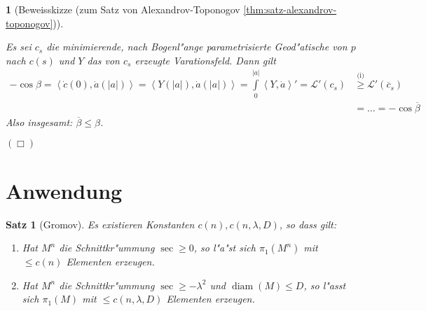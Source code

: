 \documentclass[paper=A4, twoside, chapterprefix=true, bibliography=totoc, headsepline]{scrbook}
\DeclareMathOperator{\diam}{diam}   %
\theoremstyle{plain}
\newtheorem{Satz}[Dfn]{Satz}
\theoremstyle{nonumberplain}
\theoremstyle{empty}
\newtheorem{emptythm}{}%
\theoremstyle{break}
\begin{document}
\begin{emptythm}[Beweisskizze (zum Satz von Alexandrov-Toponogov \ref{thm:satz-alexandrov-toponogov})]
\begin{enumerate}[label=(\roman*),leftmargin=*,widest=ii]
\begin{center}
\end{center}
	Es sei $c_s$ die minimierende, nach Bogenl"ange parametrisierte Geod"atische von $p$ nach $c(s)$ und $Y$ das von $c_s$ erzeugte Varationsfeld.
	Dann gilt
	\begin{align*}
		- \cos \beta  = \left<\dot c(0), \dot a(|a|)\right> 
		= \left<Y(|a|), \dot a(|a|) \right>
		= \int\limits_0^{|a|} \left<Y, \dot a\right>'
		= \mathcal L'(c_s)
		&\overset{\text{(i)}}{\geq} \mathcal L'(\overline c_s)\\
		& = \ldots = -\cos \overline \beta
	\end{align*}
	Also insgesamt: $\overline \beta \leq \beta$.
\end{enumerate}
\hfill\ensuremath{(\Box)}
\end{emptythm}


\section{Anwendung}

\begin{Satz}[Gromov]
  Es existieren Konstanten $c(n), c(n,\lambda,D)$, so dass gilt:
  \begin{enumerate}[label=(\roman*)]
  \item Hat $M^n$ die Schnittkr"ummung $\sec \geq 0$, so l"a"st sich $\pi_1(M^n)$ mit $\leq c(n)$ Elementen erzeugen.
  \item Hat $M^n$ die Schnittkr"ummung $\sec \geq - \lambda^2$ und $\diam(M) \leq D$, so l"asst sich $\pi_1(M)$ mit $\leq c(n,\lambda,D)$ Elementen erzeugen.
  \end{enumerate}
\end{Satz}
\end{document}
